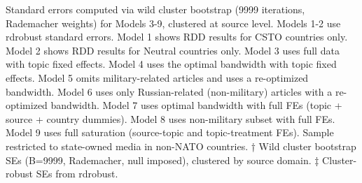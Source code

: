 \begin{table}[!t]
\begin{minipage}{\linewidth}
Standard errors computed via wild cluster bootstrap (9999 iterations, Rademacher
weights) for Models 3-9, clustered at source level. Models 1-2 use rdrobust
standard errors. Model 1 shows RDD results for CSTO countries only. Model 2
shows RDD results for Neutral countries only. Model 3 uses full data with topic
fixed effects. Model 4 uses the optimal bandwidth with topic fixed effects.
Model 5 omits military-related articles and uses a re-optimized bandwidth.
Model 6 uses only Russian-related (non-military) articles with a re-optimized
bandwidth. Model 7 uses optimal bandwidth with full FEs (topic + source +
country dummies). Model 8 uses non-military subset with full FEs. Model 9 uses
full saturation (source-topic and topic-treatment FEs). Sample restricted to
state-owned media in non-NATO countries. † Wild cluster bootstrap SEs (B=9999,
Rademacher, null imposed), clustered by source domain. ‡ Cluster-robust SEs from
rdrobust.\\
\end{minipage}
\end{table}

